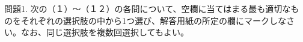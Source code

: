 \documentclass{jsarticle}
\begin{document}
問題1. 次の（１）～（１２）の各問について、空欄に当てはまる最も適切なものをそれぞれの選択肢の中から1つ選び、解答用紙の所定の欄にマークしなさい。なお、同じ選択肢を複数回選択してもよい。
\end{document}
